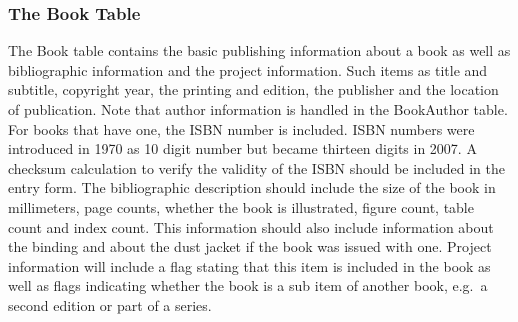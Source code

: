 \documentclass{article}%
\begin{document}
\subsubsection{The Book Table}

The Book table contains the basic publishing information about a book
as well as bibliographic information and the project information. Such
items as title and subtitle, copyright year, the printing and edition,
the publisher and the location of publication. Note that author
information is handled in the BookAuthor table. For books that have
one, the ISBN number is included.  ISBN numbers were introduced in
1970 as 10 digit number but became thirteen digits in 2007.  A
checksum calculation to verify the validity of the ISBN should be
included in the entry form. The bibliographic description should
include the size of the book in millimeters, page counts, whether the
book is illustrated, figure count, table count and index count.  This
information should also include information about the binding and
about the dust jacket if the book was issued with one. Project
information will include a flag stating that this item is included in
the book as well as flags indicating whether the book is a sub item of
another book, e.g.\ a second edition or part of a series.
\end{document}
